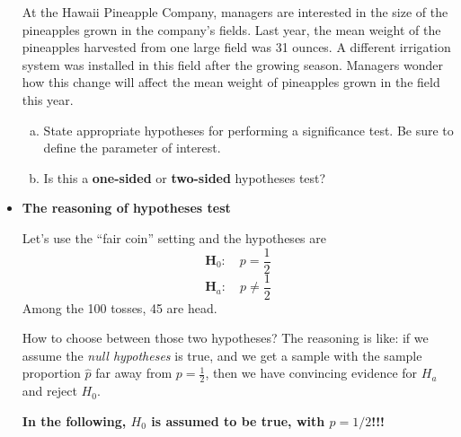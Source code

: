 \documentclass[a4paper, 12pt,twoside]{book}
\begin{document}
\begin{itemize}
{{At the Hawaii Pineapple Company, managers are interested in the size of the pineapples grown in the company’s fields. Last year, the mean weight of the pineapples harvested from one large field was 31 ounces. A  different irrigation system was installed in this field after the growing season.  Managers wonder how this change will affect the mean weight of  pineapples grown in the field this year.\vspace{0.3cm}
\begin{enumerate}[(a)]
    \item State appropriate hypotheses for performing a significance test. Be sure to define the parameter of interest.
    \item Is this a \textbf{one-sided} or \textbf{two-sided} hypotheses test?
\end{enumerate}
}}
\newpage





\item \textbf{The reasoning of hypotheses test}\vspace{0.3cm}

Let's use the ``fair coin'' setting and the hypotheses are
$$\textbf{H}_0:\quad p=\frac{1}{2}$$
$$\textbf{H}_a:\quad p\ne\frac{1}{2}$$ 
Among the 100 tosses, 45 are head.\vspace{0.3cm}

How to choose between those two hypotheses? The reasoning is like:   if we assume the \textit{null hypotheses} is true, and we get a sample with the sample proportion $\hat{p}$ far away from $\displaystyle p= \frac{1}{2}$, then we have convincing evidence for $H_a$ and reject $H_0$. \vspace{0.3cm}

\textbf{In the following, $H_0$ is assumed to be true, with $p = 1/2$!!!}\vspace{0.3cm}



\end{itemize}
\end{document}
